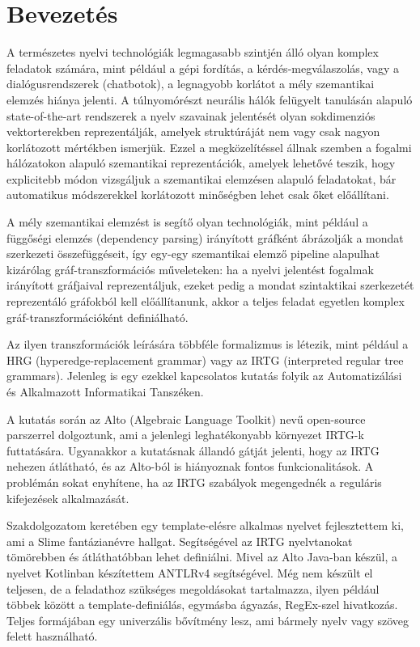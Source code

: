 \chapter{Bevezetés}
\label{sec:introducton}


A természetes nyelvi technológiák legmagasabb szintjén álló olyan komplex feladatok számára, mint például a gépi fordítás, a kérdés-megválaszolás, vagy a dialógusrendszerek (chatbotok), a legnagyobb korlátot a mély szemantikai elemzés hiánya jelenti. A túlnyomórészt neurális hálók felügyelt tanulásán alapuló state-of-the-art rendszerek a nyelv szavainak jelentését olyan sokdimenziós vektorterekben reprezentálják, amelyek struktúráját nem vagy csak nagyon korlátozott mértékben ismerjük. Ezzel a megközelítéssel állnak szemben a fogalmi hálózatokon alapuló szemantikai reprezentációk, amelyek lehetővé teszik, hogy explicitebb módon vizsgáljuk a szemantikai elemzésen alapuló feladatokat, bár automatikus módszerekkel korlátozott minőségben lehet csak őket előállítani.

A mély szemantikai elemzést is segítő olyan technológiák, mint például a függőségi elemzés (dependency parsing) irányított gráfként ábrázolják a mondat szerkezeti összefüggéseit, így egy-egy szemantikai elemző pipeline alapulhat kizárólag gráf-transzformációs műveleteken: ha a nyelvi
jelentést fogalmak irányított gráfjaival reprezentáljuk, ezeket pedig a mondat szintaktikai
szerkezetét reprezentáló gráfokból kell előállítanunk, akkor a teljes feladat egyetlen komplex
gráf-transzformációként definiálható.

Az ilyen transzformációk leírására többféle formalizmus is létezik, mint például a HRG (hyperedge-replacement grammar) vagy az IRTG (interpreted regular tree grammars). Jelenleg is egy ezekkel kapcsolatos kutatás folyik az Automatizálási és Alkalmazott Informatikai Tanszéken.

A kutatás során az Alto (Algebraic Language Toolkit) nevű open-source parszerrel dolgoztunk, ami a jelenlegi leghatékonyabb környezet IRTG-k futtatására. Ugyanakkor a kutatásnak állandó gátját jelenti, hogy az IRTG nehezen átlátható, és az Alto-ból is hiányoznak fontos funkcionalitások. A problémán sokat enyhítene, ha az IRTG szabályok megengednék a reguláris kifejezések alkalmazását.

Szakdolgozatom keretében egy template-elésre alkalmas nyelvet fejlesztettem ki, ami a Slime fantázianévre hallgat. Segítségével az IRTG nyelvtanokat tömörebben és átláthatóbban lehet definiálni. Mivel az Alto Java-ban készül, a nyelvet Kotlinban készítettem ANTLRv4 segítségével. Még nem készült el teljesen, de a feladathoz szükséges megoldásokat tartalmazza, ilyen például többek között a template-definiálás, egymásba ágyazás, RegEx-szel hivatkozás. Teljes formájában egy univerzális bővítmény lesz, ami bármely nyelv vagy szöveg felett használható.
 	 	 	
